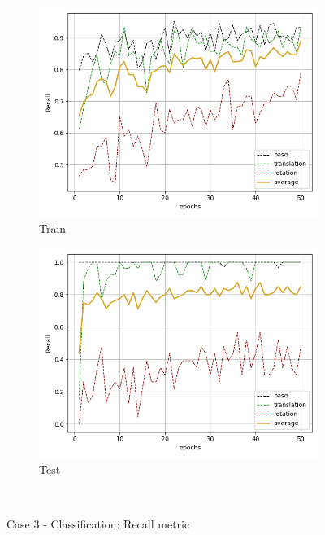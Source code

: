 \begin{figure}[H]
    \begin{subfigure}{.48\linewidth}
    \centering
    \includegraphics[scale=0.45]{Img/cls_flow_nonoise_train_rec.png}
    \caption{Train}
    \end{subfigure}
    \begin{subfigure}{.48\linewidth}
    \centering
    \includegraphics[scale=0.45]{Img/cls_flow_nonoise_test_rec.png}
    \caption{Test}
    \end{subfigure}\\
    \caption{Case 3 - Classification: Recall metric}
\end{figure}
